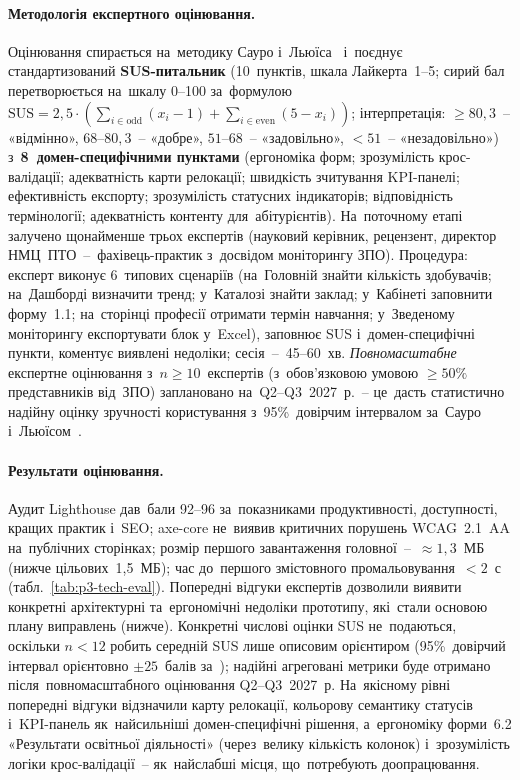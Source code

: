 \paragraph{Методологія експертного оцінювання.} Оцінювання спирається на~методику Сауро і~Льюїса~\cite{SauroLewis2016} і~поєднує стандартизований \textbf{SUS-питальник} (10~пунктів, шкала Лайкерта~1--5; сирий бал перетворюється на~шкалу 0--100 за~формулою $\mathrm{SUS} = 2{,}5 \cdot \left(\sum_{i \in \mathrm{odd}}(x_i - 1) + \sum_{i \in \mathrm{even}}(5 - x_i)\right)$; інтерпретація: $\geq 80{,}3$~-- «відмінно», $68$--$80{,}3$~-- «добре», $51$--$68$~-- «задовільно», $<51$~-- «незадовільно») з~\textbf{8~домен-специфічними пунктами} (ергономіка форм; зрозумілість крос-валідації; адекватність карти релокації; швидкість зчитування KPI-панелі; ефективність експорту; зрозумілість статусних індикаторів; відповідність термінології; адекватність контенту для~абітурієнтів). На~поточному етапі залучено щонайменше трьох експертів (науковий керівник, рецензент, директор НМЦ~ПТО~--~фахівець-практик з~досвідом моніторингу ЗПО). Процедура: експерт виконує 6~типових сценаріїв (на~Головній знайти кількість здобувачів; на~Дашборді визначити тренд; у~Каталозі знайти заклад; у~Кабінеті заповнити форму~1.1; на~сторінці професії отримати термін навчання; у~Зведеному моніторингу експортувати блок у~Excel), заповнює SUS і~домен-специфічні пункти, коментує виявлені недоліки; сесія~--~45--60~хв. \emph{Повномасштабне} експертне оцінювання з~$n\geq 10$~експертів (з~обов'язковою умовою $\geq 50\%$ представників від~ЗПО) заплановано на~Q2--Q3~2027~р.~-- це~дасть статистично надійну оцінку зручності користування з~95\%~довірчим інтервалом за~Сауро і~Льюїсом~\cite{SauroLewis2016}.

\paragraph{Результати оцінювання.} Аудит Lighthouse дав~бали 92--96 за~показниками продуктивності, доступності, кращих практик і~SEO; axe-core не~виявив критичних порушень WCAG~2.1~AA на~публічних сторінках; розмір першого завантаження головної~--~$\approx 1{,}3$~МБ (нижче цільових~1,5~МБ); час до~першого змістовного промальовування~$<2$~с (табл.~\ref{tab:p3-tech-eval}). Попередні відгуки експертів дозволили виявити конкретні архітектурні та~ергономічні недоліки прототипу, які~стали основою плану виправлень (нижче). Конкретні числові оцінки SUS не~подаються, оскільки $n{<}12$ робить середній SUS лише описовим орієнтиром (95\%~довірчий інтервал орієнтовно $\pm 25$~балів за~\cite{SauroLewis2016}); надійні агреговані метрики буде отримано після~повномасштабного оцінювання Q2--Q3~2027~р. На~якісному рівні попередні відгуки відзначили карту релокації, кольорову семантику статусів і~KPI-панель як~найсильніші домен-специфічні рішення, а~ергономіку форми~6.2 «Результати освітньої діяльності» (через~велику кількість колонок) і~зрозумілість логіки крос-валідації~-- як~найслабші місця, що~потребують доопрацювання.

